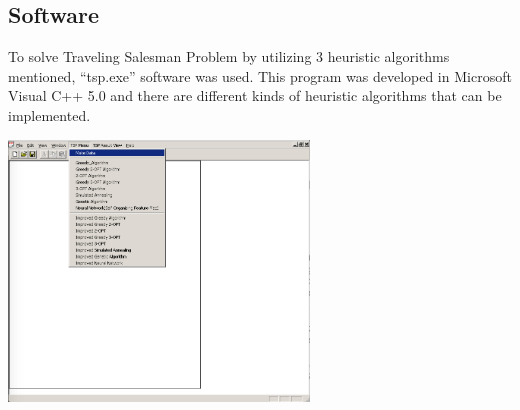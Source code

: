 \documentclass[12pt]{article}
\begin{document}
\subsection*{Software}
To solve Traveling Salesman Problem by utilizing 3 heuristic algorithms mentioned, \enquote{tsp.exe}\cite{TSPProgram} software was used. This program was developed in Microsoft Visual C++ 5.0 and there are different kinds of heuristic algorithms that can be implemented. 
\begin{center}
\includegraphics[width=8cm]{TSPProgram.png}
\end{center}

\newpage
\end{document}
